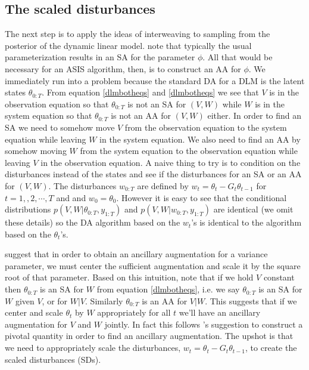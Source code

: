 \documentclass{article}
\begin{document}
\subsection{The scaled disturbances} 

The next step is to apply the ideas of interweaving to sampling from the posterior of the dynamic linear model.  note that typically the usual parameterization results in an SA for the parameter $\phi$. All that would be necessary for an ASIS algorithm, then, is to construct an AA for $\phi$. We immediately run into a problem because the standard DA for a DLM is the latent states $\theta_{0:T}$. From equation \eqref{dlmbotheqs} and \eqref{dlmbotheqs} we see that $V$ is in the observation equation so that $\theta_{0:T}$ is not an SA for $(V,W)$ while $W$ is in the system equation so that $\theta_{0:T}$ is not an AA for $(V,W)$ either. In order to find an SA we need to somehow move $V$ from the observation equation to the system equation while leaving $W$ in the system equation. We also need to find an AA by somehow moving $W$ from the system equation to the observation equation while leaving $V$ in the observation equation. A naive thing to try is to condition on the disturbances instead of the states and see if the disturbances for an SA or an AA for $(V,W)$. The disturbances $w_{0:T}$ are defined by $w_t = \theta_t - G_t\theta_{t-1}$ for $t=1,,2,\cdots,T$ and and $w_0=\theta_0$. However it is easy to see that the conditional distributions $p(V,W|\theta_{0:T},y_{1:T})$ and $p(V,W|w_{0:T},y_{1:T})$ are identical (we omit these details) so the DA algorithm based on the $w_t$'s is identical to the algorithm based on the $\theta_t$'s.

 suggest that in order to obtain an ancillary augmentation for a variance parameter, we must center the sufficient augmentation and scale it  by the square root of that parameter. Based on this intuition, note that if we hold $V$ constant then $\theta_{0:T}$ is an SA for $W$ from equation \eqref{dlmbotheqs}, i.e. we say $\theta_{0:T}$ is an SA for $W$ given $V$, or for $W|V$. Similarly $\theta_{0:T}$ is an AA for $V|W$. This suggests that if we center and scale $\theta_{t}$ by $W$ appropriately for all $t$ we'll have an ancillary augmentation for $V$ and $W$ jointly. In fact this follows 's suggestion to construct a pivotal quantity in order to find an ancillary augmentation. The upshot is that we need to appropriately scale the disturbances, $w_t = \theta_t - G_t\theta_{t-1}$, to create the scaled disturbances (SDs).
\end{document}
